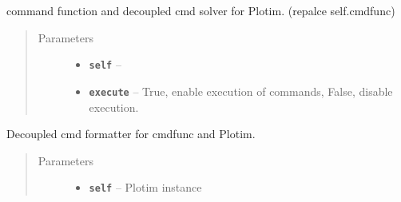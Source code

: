 \documentclass[letterpaper,10pt,english]{sphinxmanual}
\begin{document}
\begin{fulllineitems}
\begin{fulllineitems}
\begin{quote}
\begin{description}
\end{description}\end{quote}

\end{fulllineitems}


\begin{fulllineitems}
\label{RRtoolbox.lib:RRtoolbox.lib.plotter.Plotim.cmdfunc}
command function and decoupled cmd solver for Plotim. (repalce self.cmdfunc)
\begin{quote}\begin{description}
\item[{Parameters}] \leavevmode\begin{itemize}
\item {} 
\textbf{\texttt{self}} -- 

\item {} 
\textbf{\texttt{execute}} -- True, enable execution of commands, False, disable execution.

\end{itemize}

\end{description}\end{quote}

\end{fulllineitems}


\begin{fulllineitems}
\label{RRtoolbox.lib:RRtoolbox.lib.plotter.Plotim.errorbackground}
\end{fulllineitems}


\begin{fulllineitems}
\label{RRtoolbox.lib:RRtoolbox.lib.plotter.Plotim.formatcmd}
Decoupled cmd formatter for cmdfunc and Plotim.
\begin{quote}\begin{description}
\item[{Parameters}] \leavevmode\begin{itemize}
\item {} 
\textbf{\texttt{self}} -- Plotim instance


\end{itemize}
\end{description}
\end{quote}
\end{fulllineitems}
\end{fulllineitems}
\end{document}
